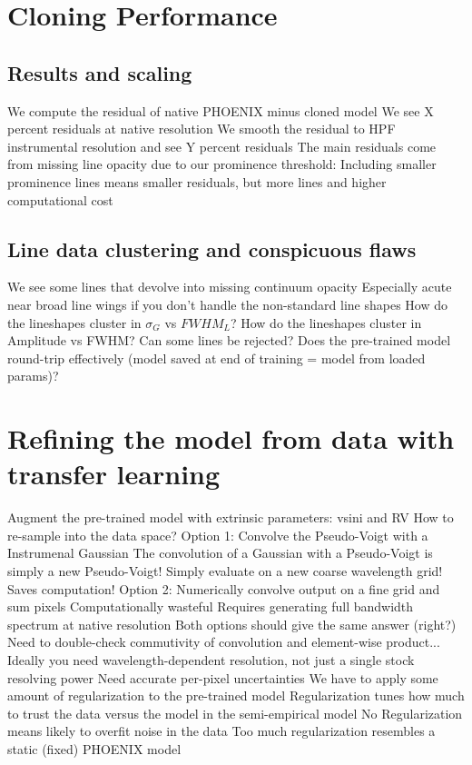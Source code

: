 \documentclass[modern]{aastex631}
\begin{document}
\section{Cloning Performance}

\subsection{Results and scaling}

\begin{outline}
  \1 We compute the residual of native PHOENIX minus cloned model
  \1 We see X percent residuals at native resolution
  \1 We smooth the residual to HPF instrumental resolution and see Y percent residuals
  \1 The main residuals come from missing line opacity due to our prominence threshold:
  \1 Including smaller prominence lines means smaller residuals, but more lines and higher computational cost
\end{outline}

\subsection{Line data clustering and conspicuous flaws}
\begin{outline}
  \1 We see some lines that devolve into missing continuum opacity
  \1 Especially acute near broad line wings if you don't handle the non-standard line shapes
  \1 How do the lineshapes cluster in $\sigma_G$ vs $FWHM_L$?
  \1 How do the lineshapes cluster in Amplitude vs FWHM? Can some lines be rejected?
  \1 Does the pre-trained model round-trip effectively (model saved at end of training = model from loaded params)?
\end{outline}


\section{Refining the model from data with transfer learning}
\begin{outline}
  \1 Augment the pre-trained model with extrinsic parameters:
  \2 vsini and RV
  \1 How to re-sample into the data space?
  \1 Option 1: Convolve the Pseudo-Voigt with a Instrumenal Gaussian
  \2 The convolution of a Gaussian with a Pseudo-Voigt is simply a new Pseudo-Voigt!
  \2 Simply evaluate on a new coarse wavelength grid!  Saves computation!
  \1 Option 2: Numerically convolve output on a fine grid and sum pixels
  \2 Computationally wasteful
  \2 Requires generating full bandwidth spectrum at native resolution
  \1 Both options should give the same answer (right?)
  \2 Need to double-check commutivity of convolution and element-wise product...
  \1 Ideally you need wavelength-dependent resolution, not just a single stock resolving power
  \1 Need accurate per-pixel uncertainties
  \1 We have to apply some amount of regularization to the pre-trained model
  \2 Regularization tunes how much to trust the data versus the model in the semi-empirical model
  \2 No Regularization means likely to overfit noise in the data
  \2 Too much regularization resembles a static (fixed) PHOENIX model
\end{outline}
\end{document}
